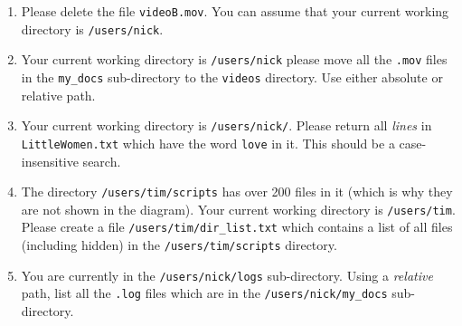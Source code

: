 \documentclass[11pt]{article}
\begin{document}
\begin{enumerate}

\item Please delete the file \texttt{videoB.mov}. You can assume that your current working directory is \texttt{/users/nick}.
\vspace{1.25cm}
\item Your current working directory is \texttt{/users/nick} please move all the \texttt{.mov} files in the \texttt{my\_docs} sub-directory to the \texttt{videos} directory. Use either absolute or relative path.
\vspace{1.25cm}
\item Your current working directory is \texttt{/users/nick/}. Please return all \emph{lines} in \texttt{LittleWomen.txt} which have the word \texttt{love} in it. This should be a case-insensitive search.
\vspace{1.25cm}
\item The directory \texttt{/users/tim/scripts} has over 200 files in it (which is why they are not shown in the diagram). Your current working directory is \texttt{/users/tim}. Please create a file \texttt{/users/tim/dir\_list.txt} which contains a list of all files (including hidden) in the \texttt{/users/tim/scripts} directory.

\vspace{1.25cm}
\item You are currently in the \texttt{/users/nick/logs} sub-directory. Using a \emph{relative} path, list all the \texttt{.log} files which are in the \texttt{/users/nick/my\_docs} sub-directory.




\end{enumerate}
\end{document}
